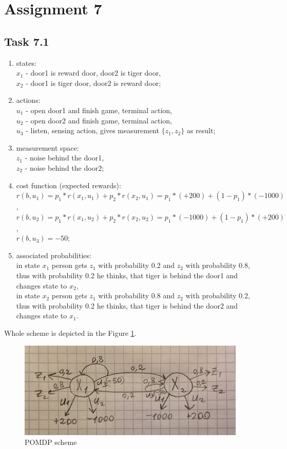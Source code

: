 \documentclass[english]{scrartcl}
\begin{document}
\section*{Assignment 7}
\subsection*{Task 7.1}
\begin{enumerate}
\item states:
\\$x_1$ - door1 is reward door, door2 is tiger door, 
\\$x_2$ - door1 is tiger door, door2 is reward door;
\item actions:
\\$u_1$ - open door1 and finish game, terminal action, 
\\$u_2$ - open door2 and finish game, terminal action, 
\\$u_3$ - listen, sensing action, gives measurement $\{z_1, z_2\}$ as result;
\item measurement space:
\\$z_1$ - noise behind the door1,
\\$z_2$ - noise behind the door2;
\item cost function (expected rewards):
\\$r(b,u_1)=p_1*r(x_1,u_1)+p_2*r(x_2,u_1)=p_1*(+200)+(1-p_1)*(-1000)$,
\\$r(b,u_2)=p_1*r(x_1,u_2)+p_2*r(x_2,u_2)=p_1*(-1000)+(1-p_1)*(+200)$,
\\$r(b,u_3)=-50$;
\item associated probabilities:
\\in state $x_1$ person gets $z_1$ with probability 0.2 and $z_2$ with probability 0.8, thus with probability 0.2 he thinks, that tiger is behind the door1 and changes state to $x_2$,
\\in state $x_2$ person gets $z_1$ with probability 0.8 and $z_2$ with probability 0.2, thus with probability 0.2 he thinks, that tiger is behind the door2 and changes state to $x_1$.
\end{enumerate}
Whole scheme is depicted in the Figure \ref{fig:7-1}.

\begin{figure}[h]
\centering
\includegraphics{./7-1}
\caption{POMDP scheme}
\label{fig:7-1}
\end{figure}
\end{document}
